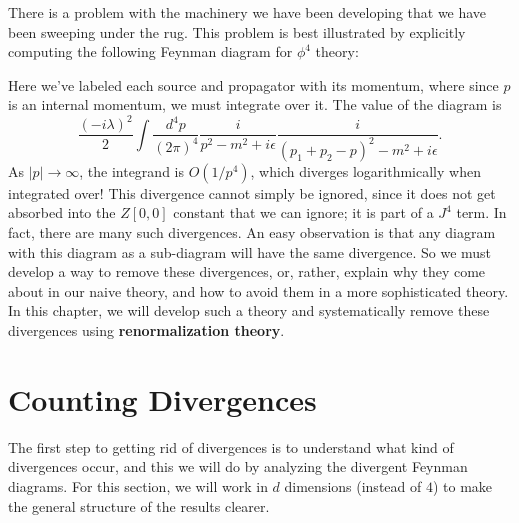 \documentclass{report}
\theoremstyle{plain}
\theoremstyle{definition}
\theoremstyle{remark}
\begin{document}
There is a problem with the machinery we have been developing that we
have been sweeping under the rug. This problem is best illustrated by
explicitly computing the following Feynman diagram for $\phi^4$
theory:
\begin{center}
\end{center}
Here we've labeled each source and propagator with its momentum, where
since $p$ is an internal momentum, we must integrate over it. The
value of the diagram is
$$ \frac{(-i\lambda)^2}{2} \int \frac{d^4p}{(2\pi)^4} \frac{i}{p^2 - m^2 + i\epsilon} \frac{i}{(p_1 + p_2 - p)^2 - m^2 + i\epsilon}. $$
As $|p| \to \infty$, the integrand is $O(1/p^4)$, which diverges
logarithmically when integrated over! This divergence cannot simply be
ignored, since it does not get absorbed into the $Z[0,0]$ constant
that we can ignore; it is part of a $J^4$ term. In fact, there are
many such divergences. An easy observation is that any diagram with
this diagram as a sub-diagram will have the same divergence. So we
must develop a way to remove these divergences, or, rather, explain
why they come about in our naive theory, and how to avoid them in a
more sophisticated theory. In this chapter, we will develop such a
theory and systematically remove these divergences using {\bf
  renormalization theory}.

\section{Counting Divergences}

The first step to getting rid of divergences is to understand what
kind of divergences occur, and this we will do by analyzing the
divergent Feynman diagrams. For this section, we will work in $d$
dimensions (instead of $4$) to make the general structure of the
results clearer.
\end{document}
